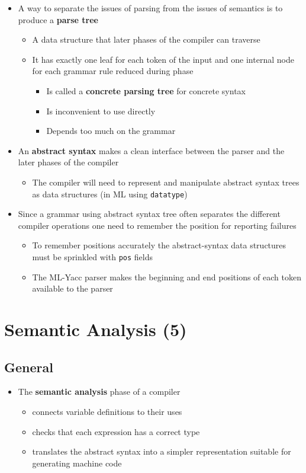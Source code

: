 \documentclass[11pt]{article}
\begin{document}
\begin{itemize}
\item A way to separate the issues of parsing from the issues of semantics is to produce a \textbf{parse tree}
\begin{itemize}
\item A data structure that later phases of the compiler can traverse
\item It has exactly one leaf for each token of the input and one internal node for each grammar rule reduced during phase
\begin{itemize}
\item Is called a \textbf{concrete parsing tree} for concrete syntax
\item Is inconvenient to use directly
\item Depends too much on the grammar
\end{itemize}
\end{itemize}

\item An \textbf{abstract syntax} makes a clean interface between the parser and the later phases of the compiler
\begin{itemize}
\item The compiler will need to represent and manipulate abstract syntax trees as data structures (in ML using \texttt{datatype})
\end{itemize}

\item Since a grammar using abstract syntax tree often separates the different compiler operations one need to remember the position for reporting failures
\begin{itemize}
\item To remember positions accurately the abstract-syntax data structures must be sprinkled with \texttt{pos} fields
\item The ML-Yacc parser makes the beginning and end positions of each token available to the parser
\end{itemize}
\end{itemize}

\section{Semantic Analysis (5)}
\label{sec:orgec2f3e2}
\subsection{General}
\label{sec:org605b567}
\begin{itemize}
\item The \textbf{semantic analysis} phase of a compiler
\begin{itemize}
\item connects variable definitions to their uses
\item checks that each expression has a correct type
\item translates the abstract syntax into a simpler representation suitable for generating machine code
\end{itemize}
\end{itemize}
\end{document}
